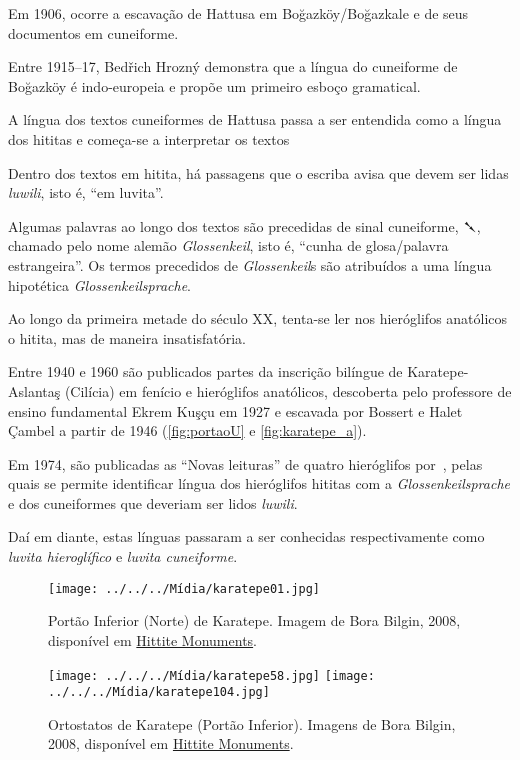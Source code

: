 \documentclass[article]{luvita}
\begin{document}
\begin{compactitem}
	\item Em 1906, ocorre a escavação de Hattusa em Boğazköy/Boğazkale e de seus
	documentos em cuneiforme.
	\item Entre 1915--17, Bedřich Hrozný demonstra que a língua do cuneiforme de
	Boğazköy é indo-europeia e propõe um primeiro esboço gramatical.
	\item A língua dos textos cuneiformes de Hattusa passa a ser entendida como a
	língua dos hititas e começa-se a interpretar os textos
	\item Dentro dos textos em hitita, há passagens que o escriba avisa que devem
	ser lidas \emph{luwili}, isto é, ``em luvita''.
	\item Algumas palavras ao longo dos textos são precedidas de sinal cuneiforme,
	\foreignlanguage{hittite}{𒃵}, chamado pelo nome alemão \emph{Glossenkeil},
	isto é, ``cunha de glosa/palavra estrangeira''. Os termos precedidos de
	\emph{Glossenkeil}s são atribuídos a uma língua hipotética
	\emph{Glossenkeilsprache}.
	\item Ao longo da primeira metade do século XX, tenta-se ler nos hieróglifos
	anatólicos o hitita, mas de maneira insatisfatória.
	\item Entre 1940 e 1960 são publicados partes da inscrição bilíngue de
	Karatepe-Aslantaş (Cilícia) em fenício e hieróglifos anatólicos, descoberta
	pelo professore de ensino fundamental Ekrem Kuşçu em 1927 e escavada por Bossert e
	Halet Çambel a partir de 1946 (\autoref{fig:portaoU} e
	\autoref{fig:karatepe_a}).
	\item Em 1974, são publicadas as ``Novas leituras'' de quatro hieróglifos
	por~\textcite{HawkinsMorpurgoNeumann1974}, pelas quais se permite identificar
	língua dos hieróglifos hititas com a
	\emph{\foreignlanguage{german}{Glossenkeilsprache}} e dos cuneiformes que deveriam
	ser lidos \emph{luwili}.
	\item Daí em diante, estas línguas passaram a ser conhecidas respectivamente como
	\emph{luvita hieroglífico} e \emph{luvita cuneiforme}.
\end{compactitem}


\begin{figure}[b]
	\begin{center}
		\texttt{[image: ../../../Mídia/karatepe01.jpg]}
	\end{center}
	\caption[Portão Inferior (Norte) de Karatepe]{Portão Inferior (Norte) de
		Karatepe.
		Imagem de Bora Bilgin, 2008, disponível em
		\href{https://www.hittitemonuments.com/karatepe}{Hittite Monuments}.
	}\label{fig:portaoU}
\end{figure}
\begin{figure}
	\begin{center}
		\texttt{[image: ../../../Mídia/karatepe58.jpg]}
		\texttt{[image: ../../../Mídia/karatepe104.jpg]}
	\end{center}
	\caption[Ortostatos de Karatepe (Portão Inferior)]{Ortostatos de Karatepe
		(Portão Inferior).
		Imagens de Bora Bilgin, 2008, disponível em
		\href{https://www.hittitemonuments.com/karatepe}{Hittite Monuments}.
	}\label{fig:karatepe_a}
\end{figure}
\end{document}
